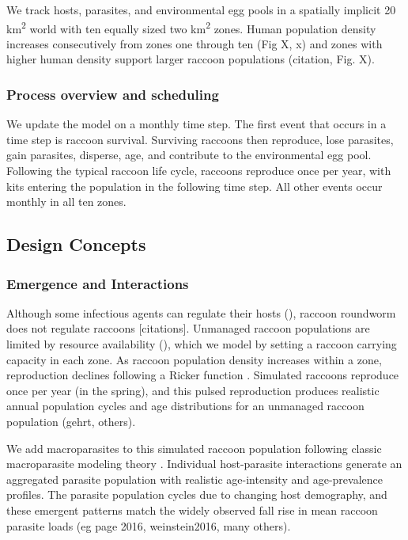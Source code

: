 \documentclass[11pt]{article}
\begin{document}
We track hosts, parasites, and environmental egg pools in a spatially
implicit 20 km\textsuperscript{2} world with ten equally sized two
km\textsuperscript{2} zones. Human population density increases
consecutively from zones one through ten (Fig X, x) and zones with
higher human density support larger raccoon populations (citation, Fig. X). 


\subsubsection{Process overview and scheduling}

We update the model on a monthly time step. The first event that occurs in a time step is raccoon survival. Surviving raccoons then reproduce, lose
parasites, gain parasites, disperse, age, and contribute to the
environmental egg pool. Following the typical raccoon life cycle,
raccoons reproduce once per year, with kits entering the population in
the following time step. All other events occur monthly in all ten
zones.

\subsection{Design Concepts}

\subsubsection{Emergence and Interactions}

Although some infectious agents can regulate their hosts (), raccoon
roundworm does not regulate raccoons [citations]. Unmanaged raccoon populations are
limited by resource availability (), which we model by setting a raccoon
carrying capacity in each zone. As raccoon population density
increases within a zone, reproduction declines following a Ricker function \citep{Gurney1998}. Simulated raccoons
reproduce once per year (in the spring), and this pulsed reproduction
produces realistic annual population cycles and age distributions for an
unmanaged raccoon population (gehrt, others).

We add macroparasites to this simulated raccoon population following
classic macroparasite modeling theory \citep{AndersonandMay1978,Anderson1991,Cornell2010}. Individual host-parasite interactions generate an aggregated
parasite population with realistic age-intensity and age-prevalence
profiles. The parasite population cycles due to
changing host demography, and these emergent patterns match the widely
observed fall rise in mean raccoon parasite loads (eg page 2016,
weinstein2016, many others).
\end{document}
